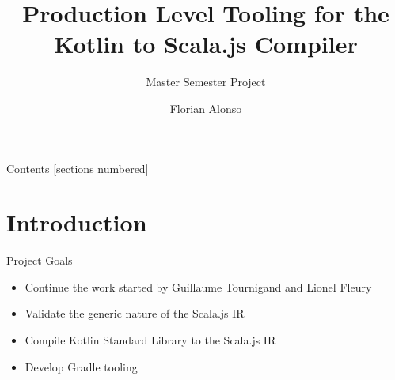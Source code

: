 \documentclass[10pt]{beamer}
\title{Production Level Tooling for the Kotlin to Scala.js Compiler}
\subtitle{Master Semester Project}
\date{}
\author{Florian Alonso}
\institute{EPFL - Programming Methods Laboratory (LAMP) }
\begin{document}
\begin{frame}
  \titlepage
\end{frame}

\begin{frame}[fragile]{Contents}
  [sections numbered]
  \tableofcontents[hideallsubsections]
\end{frame}

\section{Introduction}

\begin{frame}{Project Goals}
 \begin{itemize}
  \item Continue the work started by Guillaume Tournigand and Lionel Fleury
  \item Validate the generic nature of the Scala.js IR
  \item Compile Kotlin Standard Library to the Scala.js IR
  \item Develop Gradle tooling
 \end{itemize}

\end{frame}
\end{document}
